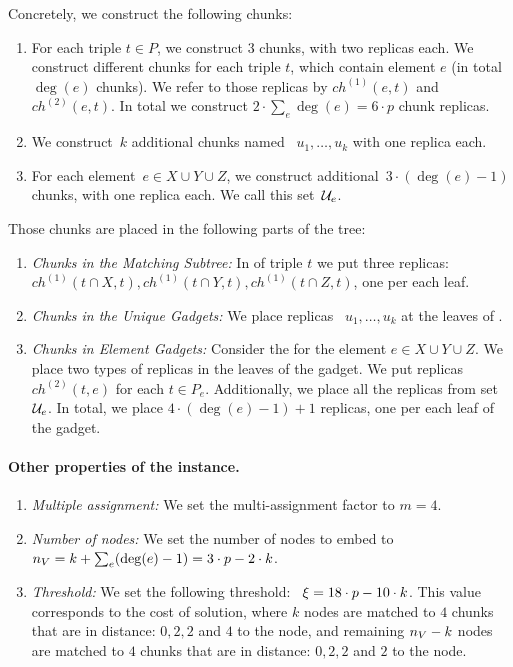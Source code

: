 Concretely, we construct the following chunks:
\begin{enumerate}
  \item For each triple $t \in P$, we construct $3$ chunks, with two replicas each.
  We construct different chunks for each triple $t$, which contain element $e$ (in total $\deg(e)$ chunks).
  We refer to those replicas by $ch^{(1)}(e, t)$ and $ch^{(2)}(e, t)$.
  In total we construct $2\cdot \sum_e\deg(e) = 6\cdot p$ chunk replicas.
  \item We construct~$k$ additional chunks named
  ~$u_1, \ldots, u_k$ with one replica each.
  \item For each element~$e\in X\cup Y\cup Z$,
  we construct additional~$3\cdot(\deg(e) - 1)$ chunks, with one replica each.
  We call this set~${\mathcal{U}_e}$.
\end{enumerate}
Those chunks are placed in the following parts of the tree:
\begin{enumerate}
  \item \emph{Chunks in the Matching Subtree:} In {\TripleGadget} of triple $t$ we put
  three replicas:
 ~$ch^{(1)}(t \cap X, t), ch^{(1)}(t \cap Y, t), ch^{(1)}(t \cap Z, t)$, one per each leaf.
  \item \emph{Chunks in the Unique Gadgets:} We place replicas
 ~$u_1,\ldots, u_k$ at the leaves of \UnqGadgets.
 \item \emph{Chunks in Element Gadgets:} Consider the \ElGadget{} for the element $e \in X\cup Y\cup Z$.
 We place two types of replicas in the leaves of the gadget.
 We put replicas $ch^{(2)}(t, e)$ for each $t \in P_e$.
 Additionally, we place all the replicas from set ${\mathcal{U}_e}$.
 In total, we place $4\cdot (\deg(e) - 1) + 1$ replicas, one per each leaf of the gadget.
\end{enumerate}

\paragraph{Other properties of the instance.}
\begin{enumerate}
  \item \emph{Multiple assignment:} We set the multi-assignment factor to $m=4$.
  \item \emph{Number of nodes:} We set the number of nodes to embed to
 ~$n_V = k + \sum_{e}(\deg(e)-1) = 3\cdot p - 2\cdot k$.
 \item \emph{Threshold:} We set the following threshold:
 ~$\xi = 18\cdot p - 10\cdot k$.
 This value corresponds to the cost of solution, where $k$ nodes are matched to $4$ chunks that are in distance: $0, 2, 2$ and $4$ to the node, and remaining $n_V-k$ nodes are matched to $4$ chunks that are in distance: $0, 2, 2$ and $2$ to the node.
\end{enumerate}

